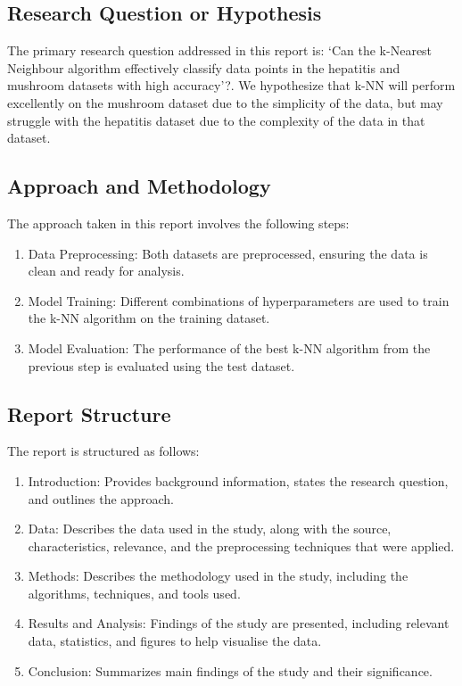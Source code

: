 \subsection{Research Question or Hypothesis}
The primary research question addressed in this report is: `Can the k-Nearest Neighbour algorithm effectively classify
data points in the hepatitis and mushroom datasets with high accuracy'?.
We hypothesize that k-NN will perform excellently on the mushroom dataset due to the simplicity of the data,
but may struggle with the hepatitis dataset due to the complexity of the data in that dataset.

\subsection{Approach and Methodology}
The approach taken in this report involves the following steps:
\begin{enumerate}
    \item Data Preprocessing: Both datasets are preprocessed, ensuring the data is clean and ready for analysis.
    \item Model Training: Different combinations of hyperparameters are used to train the k-NN algorithm on the training dataset.
    \item Model Evaluation: The performance of the best k-NN algorithm from the previous step is evaluated using the test dataset.
\end{enumerate}

\subsection{Report Structure}
The report is structured as follows:
\begin{enumerate}
    \item Introduction: Provides background information, states the research question, and outlines the approach.
    \item Data: Describes the data used in the study, along with the source, characteristics, relevance, and the preprocessing techniques that were applied.
    \item Methods: Describes the methodology used in the study, including the algorithms, techniques, and tools used.
    \item Results and Analysis: Findings of the study are presented, including relevant data, statistics, and figures to help visualise the data.
    \item Conclusion: Summarizes main findings of the study and their significance.
\end{enumerate}